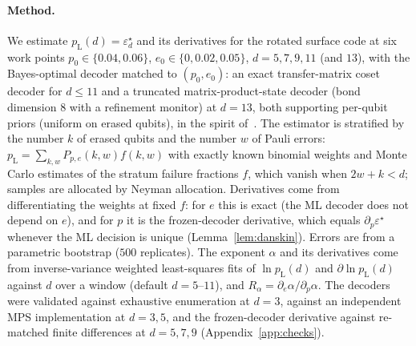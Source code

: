 \documentclass[11pt,a4paper]{article}
\theoremstyle{plain}
\theoremstyle{definition}
\theoremstyle{remark}
\newcommand{\err}{\varepsilon^{\star}}
\newcommand{\pL}{p_{\mathrm{L}}}
\begin{document}
\paragraph{Method.}
We estimate $\pL(d)=\err_d$ and its derivatives for the rotated surface code at six work points $p_0\in\{0.04,0.06\}$, $e_0\in\{0,0.02,0.05\}$, $d=5,7,9,11$ (and $13$), with the Bayes-optimal decoder matched to $(p_0,e_0)$: an exact transfer-matrix coset decoder for $d\le11$ and a truncated matrix-product-state decoder (bond dimension $8$ with a refinement monitor) at $d=13$, both supporting per-qubit priors (uniform on erased qubits), in the spirit of~\cite{BSV}. The estimator is stratified by the number $k$ of erased qubits and the number $w$ of Pauli errors: $\pL=\sum_{k,w}P_{p,e}(k,w)f(k,w)$ with exactly known binomial weights and Monte Carlo estimates of the stratum failure fractions $f$, which vanish when $2w+k<d$; samples are allocated by Neyman allocation. Derivatives come from differentiating the weights at fixed $f$: for $e$ this is exact (the ML decoder does not depend on $e$), and for $p$ it is the frozen-decoder derivative, which equals $\partial_p\err$ whenever the ML decision is unique (Lemma~\ref{lem:danskin}). Errors are from a parametric bootstrap ($500$ replicates). The exponent $\alpha$ and its derivatives come from inverse-variance weighted least-squares fits of $\ln\pL(d)$ and $\partial\ln\pL(d)$ against $d$ over a window (default $d=5$--$11$), and $R_\alpha=\partial_e\alpha/\partial_p\alpha$. The decoders were validated against exhaustive enumeration at $d=3$, against an independent MPS implementation at $d=3,5$, and the frozen-decoder derivative against re-matched finite differences at $d=5,7,9$ (Appendix~\ref{app:checks}).
\end{document}
